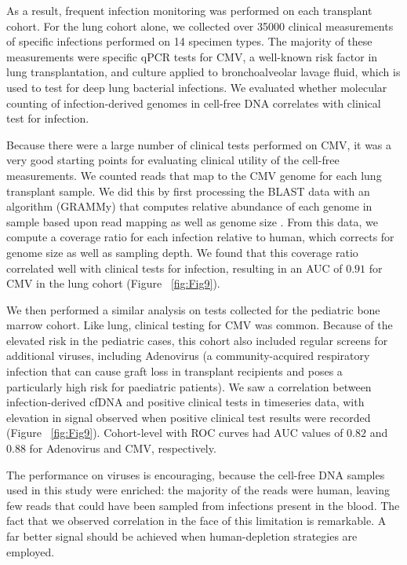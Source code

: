 As a result, frequent infection monitoring was performed on each transplant cohort. For the lung cohort alone, we collected over 35000 clinical measurements of specific infections performed on 14 specimen types. The majority of these measurements were specific qPCR tests for CMV, a well-known risk factor in lung transplantation, and culture applied to bronchoalveolar lavage fluid, which is used to test for deep lung bacterial infections. We evaluated whether molecular counting of infection-derived genomes in cell-free DNA correlates with clinical test for infection. 

Because there were a large number of clinical tests performed on CMV, it was a very good starting points for evaluating clinical utility of the cell-free measurements. We counted reads that map to the CMV genome for each lung transplant sample. We did this by first processing the BLAST data with an algorithm (GRAMMy) that computes relative abundance of each genome in sample based upon read mapping as well as genome size \cite{Xia:2011it}. From this data, we compute a coverage ratio for each infection relative to human, which corrects for genome size as well as sampling depth. We found that this coverage ratio correlated well with clinical tests for infection, resulting in an AUC of $0.91$ for CMV in the lung cohort (Figure ~\ref{fig:Fig9}). 

We then performed a similar analysis on tests collected for the pediatric bone marrow cohort. Like lung, clinical testing for CMV was common. Because of the elevated risk in the pediatric cases, this cohort also included regular screens for additional viruses, including Adenovirus (a community-acquired respiratory infection that can cause graft loss in transplant recipients and poses a particularly high risk for paediatric patients). We saw a correlation between infection-derived cfDNA and positive clinical tests in timeseries data, with elevation in signal observed when positive clinical test results were recorded (Figure ~\ref{fig:Fig9}). Cohort-level with ROC curves had AUC values of $0.82$ and $0.88$ for Adenovirus and CMV, respectively. 

The performance on viruses is encouraging, because the cell-free DNA samples used in this study were enriched: the majority of the reads were human, leaving few reads that could have been sampled from infections present in the blood. The fact that we observed correlation in the face of this limitation is remarkable. A far better signal should be achieved when human-depletion strategies are employed. 


